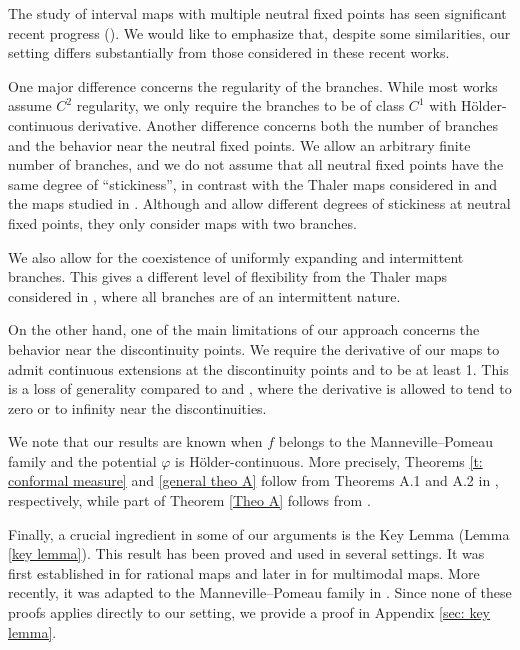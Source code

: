 \documentclass[12pt]{amsart}
\numberwithin{equation}{section} %
\numberwithin{figure}{section} %
\theoremstyle{plain}
\theoremstyle{definition}
\theoremstyle{remark}
\theoremstyle{citing}
\renewcommand{\=}{\coloneqq}
\begin{document}
The study of interval maps with multiple neutral fixed points has seen significant recent progress (\cite{coatesGelfert,coatesMelbourne,CoatesMelbourneTalebi,coatesLuzzatto,coatesLuzzattoMubarak}). We would like to emphasize that, despite some similarities, our setting differs substantially from those considered in these recent works.

One major difference concerns the regularity of the branches. While most works assume $C^2$ regularity, we only require the branches to be of class $C^{1}$ with Hölder-continuous derivative. Another difference concerns both the number of branches and the behavior near the neutral fixed points. We allow an arbitrary finite number of branches, and we do not assume that all neutral fixed points have the same degree of ``stickiness'', in contrast with the Thaler maps considered in \cite{CoatesMelbourneTalebi} and the maps studied in \cite{coatesGelfert}. Although \cite{coatesLuzzatto} and \cite{coatesLuzzattoMubarak} allow different degrees of stickiness at neutral fixed points, they only consider maps with two branches.

We also allow for the coexistence of uniformly expanding and intermittent branches. This gives a different level of flexibility from the Thaler maps considered in \cite{CoatesMelbourneTalebi}, where all branches are of an intermittent nature.

On the other hand, one of the main limitations of our approach concerns the behavior near the discontinuity points. We require the derivative of our maps to admit continuous extensions at the discontinuity points and to be at least 1. This is a loss of generality compared to \cite{coatesLuzzatto} and \cite{coatesLuzzattoMubarak}, where the derivative is allowed to tend to zero or to infinity near the discontinuities.

We note that our results are known when $f$ belongs to the Manneville--Pomeau family and the potential $\varphi$ is Hölder-continuous. More precisely, Theorems \ref{t: conformal measure} and \ref{general theo A} follow from Theorems A.1 and A.2 in \cite{InoquioRivera2}, respectively, while part of Theorem \ref{Theo A} follows from \cite[Proposition 2.10]{coronelRivera1}.

Finally, a crucial ingredient in some of our arguments is the Key Lemma (Lemma \ref{key lemma}). This result has been proved and used in several settings. It was first established in \cite{InoquioRivera} for rational maps and later in \cite{LiHuaibin} for multimodal maps. More recently, it was adapted to the Manneville--Pomeau family in \cite{coronelRivera1}. Since none of these proofs applies directly to our setting, we provide a proof in Appendix \ref{sec: key lemma}.
\end{document}

